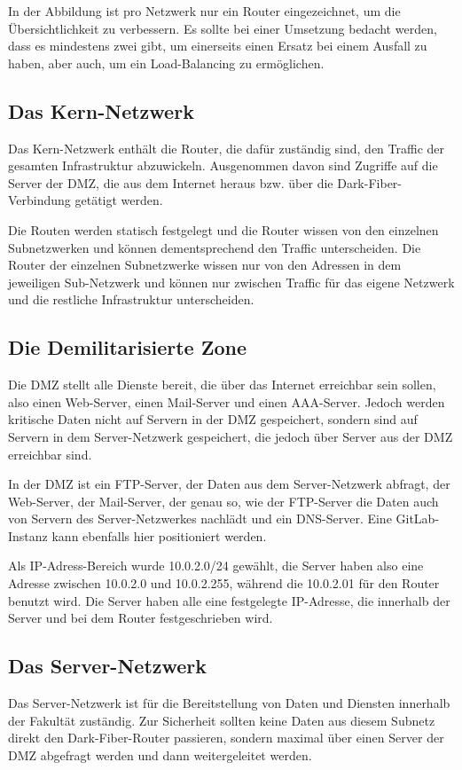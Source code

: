 In der Abbildung ist pro Netzwerk nur ein Router eingezeichnet, um die Übersichtlichkeit zu verbessern. Es sollte bei einer Umsetzung bedacht werden, dass es mindestens zwei gibt, um einerseits einen Ersatz bei einem Ausfall zu haben, aber auch, um  ein Load-Balancing zu ermöglichen.

\subsection{Das Kern-Netzwerk}
Das Kern-Netzwerk enthält die Router, die dafür zuständig sind, den Traffic der gesamten Infrastruktur abzuwickeln. Ausgenommen davon sind Zugriffe auf die Server der DMZ, die aus dem Internet heraus bzw. über die Dark-Fiber-Verbindung getätigt werden.

Die Routen werden statisch festgelegt und die Router wissen von den einzelnen Subnetzwerken und können dementsprechend den Traffic unterscheiden. Die Router der einzelnen Subnetzwerke wissen nur von den Adressen in dem jeweiligen Sub-Netzwerk und können nur zwischen Traffic für das eigene Netzwerk und die restliche Infrastruktur unterscheiden.

\subsection{Die Demilitarisierte Zone}
Die DMZ stellt alle Dienste bereit, die über das Internet erreichbar sein sollen, also einen Web-Server, einen Mail-Server und einen AAA-Server. Jedoch werden kritische Daten nicht auf Servern in der DMZ gespeichert, sondern sind auf Servern in dem Server-Netzwerk gespeichert, die jedoch über Server aus der DMZ erreichbar sind.

In der DMZ ist ein FTP-Server, der Daten aus dem Server-Netzwerk abfragt, der Web-Server, der Mail-Server, der genau so, wie der FTP-Server die Daten auch von Servern des Server-Netzwerkes nachlädt und ein DNS-Server. Eine GitLab-Instanz kann ebenfalls hier positioniert werden.

Als IP-Adress-Bereich wurde 10.0.2.0/24 gewählt, die Server haben also eine Adresse zwischen 10.0.2.0 und 10.0.2.255, während die 10.0.2.01 für den Router benutzt wird. Die Server haben alle eine festgelegte IP-Adresse, die innerhalb der Server und bei dem Router festgeschrieben wird.


\subsection{Das Server-Netzwerk}
Das Server-Netzwerk ist für die Bereitstellung von Daten und Diensten innerhalb der Fakultät zuständig. Zur Sicherheit sollten keine Daten aus diesem Subnetz direkt den Dark-Fiber-Router passieren, sondern maximal über einen Server der DMZ abgefragt werden und dann weitergeleitet werden.

